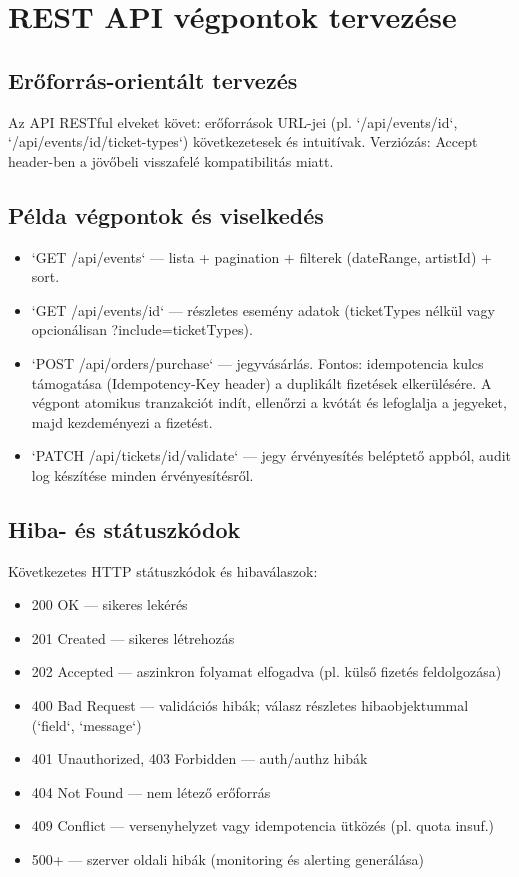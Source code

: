 \documentclass[colorlinks]{docs}
\theoremstyle{definition}
\theoremstyle{remark}
\begin{document}
\section{REST API végpontok tervezése}
\subsection{Erőforrás-orientált tervezés}
Az API RESTful elveket követ: erőforrások URL-jei (pl. `/api/events/{id}`, `/api/events/{id}/ticket-types`) következetesek és intuitívak. Verziózás: Accept header-ben a jövőbeli visszafelé kompatibilitás miatt.

\subsection{Példa végpontok és viselkedés}
\begin{itemize}
    \item `GET /api/events` — lista + pagination + filterek (dateRange, artistId) + sort.
    \item `GET /api/events/{id}` — részletes esemény adatok (ticketTypes nélkül vagy opcionálisan ?include=ticketTypes).
    \item `POST /api/orders/purchase` — jegyvásárlás. Fontos: idempotencia kulcs támogatása (Idempotency-Key header) a duplikált fizetések elkerülésére. A végpont atomikus tranzakciót indít, ellenőrzi a kvótát és lefoglalja a jegyeket, majd kezdeményezi a fizetést.
    \item `PATCH /api/tickets/{id}/validate` — jegy érvényesítés beléptető appból, audit log készítése minden érvényesítésről.
\end{itemize}

\subsection{Hiba- és státuszkódok}
Következetes HTTP státuszkódok és hibaválaszok:
\begin{itemize}
    \item 200 OK — sikeres lekérés
    \item 201 Created — sikeres létrehozás
    \item 202 Accepted — aszinkron folyamat elfogadva (pl. külső fizetés feldolgozása)
    \item 400 Bad Request — validációs hibák; válasz részletes hibaobjektummal (`field`, `message`)
    \item 401 Unauthorized, 403 Forbidden — auth/authz hibák
    \item 404 Not Found — nem létező erőforrás
    \item 409 Conflict — versenyhelyzet vagy idempotencia ütközés (pl. quota insuf.)
    \item 500+ — szerver oldali hibák (monitoring és alerting generálása)
\end{itemize}
\end{document}
